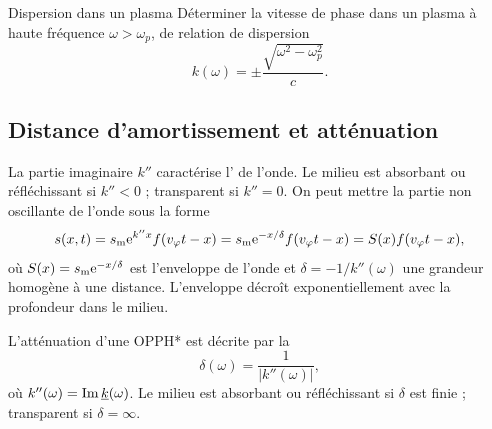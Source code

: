\documentclass[12pt,fancy]{cours}%
\begin{document}
\begin{exemple}{Dispersion dans un plasma}
  Déterminer la vitesse de phase dans un plasma à haute fréquence $\omega > \omega_p$, de relation de dispersion
  \begin{equation}
    k(\omega) = \pm \frac{\sqrt{\omega^2-\omega_p^2}}{c}.
  \end{equation}
\end{exemple}


%


\subsection{Distance d'amortissement et atténuation}  La partie imaginaire $k''$ caractérise l’ de l’onde.  Le milieu est absorbant ou réfléchissant si $k''<0$ ; transparent si $k''=0$. On peut mettre la partie non oscillante de l'onde sous la forme
\begin{equation}
\label{eq:OPPH*_vitesse_phase}
s(x,t)= s_{\rm{m}}\mathrm{e}^{k'' x}f(v_{\varphi} t-x) = s_{\rm{m}}\mathrm{e}^{-x/\delta}f(v_{\varphi} t-x) =  S(x)f(v_{\varphi} t-x),
\end{equation}
où $S(x) = s_{\rm{m}}\mathrm{e}^{-x/\delta}$ est l'enveloppe de l'onde et $\delta = -1/k''(\omega)$ une grandeur homogène à une distance. L'enveloppe décroît exponentiellement avec la profondeur dans le milieu.

\begin{definition}\label{def:}
  L'atténuation d'une OPPH* est décrite par la 
    $$
    \delta(\omega) = \frac{1}{|k''(\omega)|},
    $$
    où $k''(\omega) = {\rm Im}\, \underline{k}(\omega)$. Le milieu est absorbant ou réfléchissant si $\delta$ est finie ; transparent si $\delta=\infty$.
\end{definition}
\end{document}
